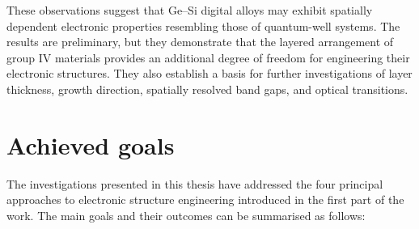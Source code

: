 These observations suggest that Ge--Si digital alloys may exhibit spatially dependent electronic properties resembling those of quantum-well systems. The results are preliminary, but they demonstrate that the layered arrangement of group IV materials provides an additional degree of freedom for engineering their electronic structures. They also establish a basis for further investigations of layer thickness, growth direction, spatially resolved band gaps, and optical transitions.

\ornament

\section*{Achieved goals}

The investigations presented in this thesis have addressed the four principal approaches to electronic structure engineering introduced in the first part of the work. The main goals and their outcomes can be summarised as follows:

